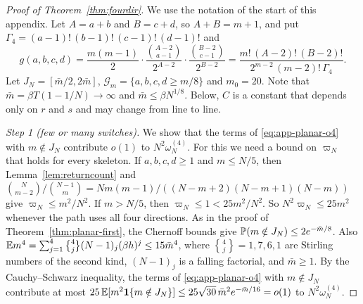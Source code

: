 \begin{proof}[Proof of Theorem~\ref{thm:fourdir}]
We use the notation of the start of this appendix. Let $A=a+b$ and $B=c+d$, so $A+B=m+1$, and put $\Gamma_4=(a-1)!\,(b-1)!\,(c-1)!\,(d-1)!$ and
\[
 g(a,b,c,d)=\frac{m(m-1)}2\cdot\frac{\binom{A-2}{a-1}}{2^{A-2}}\cdot\frac{\binom{B-2}{c-1}}{2^{B-2}}
 =\frac{m!\,(A-2)!\,(B-2)!}{2^{m-2}\,(m-2)!\,\Gamma_4}.
\]
Let $J_N=[\bar m/2,2\bar m]$, $\mathcal G_m=\{a,b,c,d\ge m/8\}$ and $m_0=20$. Note that
$\bar m=\beta T(1-1/N)\to\infty$ and $\bar m\le\beta N^{1/8}$. Below, $C$ is a constant that depends
only on $r$ and $s$ and may change from line to line.

\emph{Step 1 (few or many switches).} We show that the terms of \eqref{eq:app-planar-o4} with
$m\notin J_N$ contribute $o(1)$ to $N^2\omega^{(4)}_N$. For this we need a bound on $\varpi_N$ that holds
for every skeleton. If $a,b,c,d\ge1$ and $m\le N/5$, then
Lemma~\ref{lem:returncount} and
$\binom N{m-2}/\binom{N-1}m=Nm(m-1)/((N-m+2)(N-m+1)(N-m))$ give $\varpi_N\le m^2/N^2$. If $m>N/5$,
then $\varpi_N\le1<25m^2/N^2$. So $N^2\varpi_N\le25m^2$ whenever the path uses all four directions.
As in the proof of Theorem~\ref{thm:planar-first}, the Chernoff bounds give
$\mathbb{P}(m\notin J_N)\le2e^{-\bar m/8}$. Also
$\E m^4=\sum_{j=1}^4\genfrac\{\}{0pt}{}4j(N-1)_j(\beta h)^j\le15\bar m^4$, where $\genfrac\{\}{0pt}{}4j=1,7,6,1$ are Stirling
numbers of the second kind, $(N-1)_j$ is a falling factorial, and $\bar m\ge1$. By the
Cauchy--Schwarz inequality, the terms of \eqref{eq:app-planar-o4} with $m\notin J_N$ contribute at
most $25\,\mathbb{E}[m^2\mathbf 1\{m\notin J_N\}]\le25\sqrt{30}\,\bar m^2e^{-\bar m/16}=o(1)$ to
$N^2\omega^{(4)}_N$.


\end{proof}
